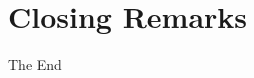 \documentclass{beamer}
\begin{document}





\section{Closing Remarks}
	\begin{frame}
	\Huge{\centerline{The End}}
	\end{frame}

\end{document}
